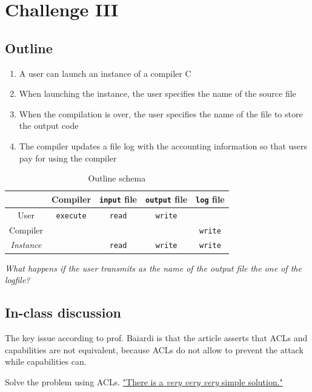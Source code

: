 \chapter{Challenge III}

\section{Outline}
\begin{enumerate}
   \item A user can launch an instance of a compiler C
   \item When launching the instance, the user specifies the name of the
   source file
   \item When the compilation is over, the user specifies the name of the
   file to store the output code
   \item The compiler updates a file log with the accounting information
   so that users pay for using the compiler
\end{enumerate}

\begin{table}[htbp]
   \centering
   \begin{tabular}{c|c|c|c|c|}
      & Compiler & \texttt{input} file & \texttt{output} file &\texttt{log} file\\
      \hline
      User & \texttt{execute} & \texttt{read} & \texttt{write} &\\
      \hline
      Compiler & & & & \texttt{write}\\
      \hline
      \textit{Instance} & & \texttt{read} & \texttt{write} & \texttt{write}\\
   \end{tabular}
   \caption{Outline schema}
   \label{tab:ch3_outline}
\end{table}
\begin{center}
   \textit{What happens if the user transmits as the name of the output file the one of the logfile?}
\end{center}

\section{In-class discussion}

The key issue according to prof. Baiardi is that the article asserts that ACLs and capabilities are not equivalent, because ACLs do not allow to prevent the attack while capabilities can.

Solve the problem using ACLs.
\underline{"There is a \textit{very very very} simple solution."}\nl

